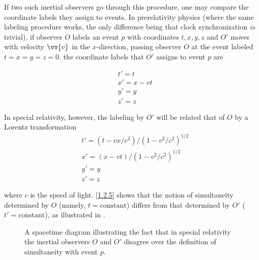 If two such inertial observers go through this procedure, one may compare the coordinate labels they assign to events. In prerelativity physics (where the same labeling procedure works, the only difference being that clock synchronization \emph{is} trivial), if observer $O$ labels an event $p$ with coordinates $t, x, y, z$ and $O'$ moves with velocity $\vv{v}$ in the $x$-direction, passing observer $O$ at the event labeled $t = x = y = z = 0$. the coordinate labels that $O'$ assigns to event $p$ are

\begin{align}
    & t'=t\label{1.2.1}\\
    & x'=x-vt\label{1.2.2}\\
    & y'=y\label{1.2.3}\\
    & z'=z\label{1.2.4}
\end{align}

In special relativity, however, the labeling by $O'$ will be related that of $O$ by a Lorentz transformation
\begin{align}
    & t'=(t-vx/c^2)/(1-v^2/c^2)^{1/2}\label{1.2.5}\\
    & x'=(x-vt)/(1-v^2/c^2)^{1/2}\label{1.2.6}\\
    & y'=y\label{1.2.7}\\
    & z'=z\label{1.2.8}
\end{align}

where $c$ is the speed of light. \eqref{1.2.5} shows that the notion of simultaneity determined by $O$ (namely, $t = \text{constant}$) differs from that determined by $O'$ ($t' = \text{constant}$), as illustrated in .

\begin{figure}[!ht]
    \centering
    \caption{A spacetime diagram illustrating the fact that in special relativity the inertial observers $O$ and $O'$ disagree over the definition of simultaneity with event $p$.}
    \label{1.3}
\end{figure}

